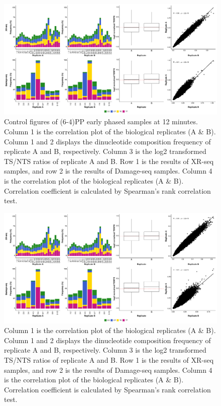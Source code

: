\begin{figure}[H]
\begin{center}
\includegraphics[width=\textwidth]{Chapters/7_appendix/figures/supfig3}
\caption[Control figures of (6-4)PP early phased samples at 12 minutes.]{Control figures of (6-4)PP early phased samples at 12 minutes. Column 1 is the correlation plot of the biological replicates (A \& B). Column 1 and 2 displays the dinucleotide composition frequency of replicate A and B, respectively. Column 3 is the log2 transformed TS/NTS ratios of replicate A and B. Row 1 is the results of XR-seq samples, and row 2 is the results of Damage-seq samples. Column 4 is the correlation plot of the biological replicates (A \& B). Correlation coefficient is calculated by Spearman’s rank correlation test.}
\label{supfig:control2}
\end{center}
\end{figure}


\begin{figure}[H]
\begin{center}
\includegraphics[width=\textwidth]{Chapters/7_appendix/figures/supfig4}
\caption[Control figures of (6-4)PP late phased samples at 12 minutes.]{Column 1 is the correlation plot of the biological replicates (A \& B). Column 1 and 2 displays the dinucleotide composition frequency of replicate A and B, respectively. Column 3 is the log2 transformed TS/NTS ratios of replicate A and B. Row 1 is the results of XR-seq samples, and row 2 is the results of Damage-seq samples. Column 4 is the correlation plot of the biological replicates (A \& B). Correlation coefficient is calculated by Spearman’s rank correlation test.}
\label{supfig:control3}
\end{center}
\end{figure}


